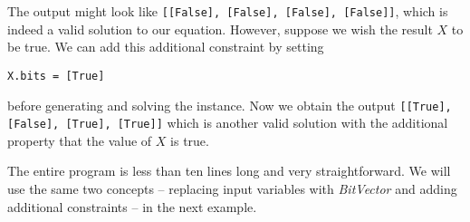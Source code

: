 The output might look like \texttt{[[False], [False], [False], [False]]}, which is indeed a valid solution to our equation.
However, suppose we wish the result $X$ to be true.
We can add this additional constraint by setting

\begin{verbatim}
X.bits = [True]
\end{verbatim}

before generating and solving the instance.
Now we obtain the output \texttt{[[True], [False], [True], [True]]} which is another valid solution with the additional property that the value of $X$ is true.

The entire program is less than ten lines long and very straightforward.
We will use the same two concepts -- replacing input variables with \emph{BitVector} and adding additional constraints -- in the next example.

